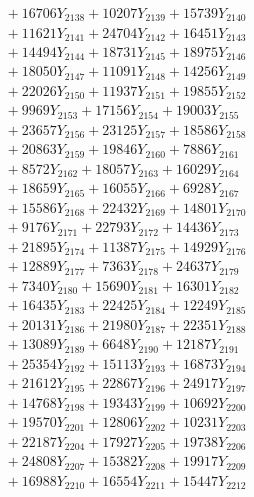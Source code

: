 \documentclass[a4paper,10pt]{article}
\begin{document}
{\begin{align}
&\;  + 16706 Y_{2138} + 10207 Y_{2139} + 15739 Y_{2140} \\[0.3ex]
&\;  + 11621 Y_{2141} + 24704 Y_{2142} + 16451 Y_{2143} \\[0.3ex]
&\;  + 14494 Y_{2144} + 18731 Y_{2145} + 18975 Y_{2146} \\[0.3ex]
&\;  + 18050 Y_{2147} + 11091 Y_{2148} + 14256 Y_{2149} \\[0.3ex]
&\;  + 22026 Y_{2150} + 11937 Y_{2151} + 19855 Y_{2152} \\[0.3ex]
&\;  + 9969 Y_{2153} + 17156 Y_{2154} + 19003 Y_{2155} \\[0.3ex]
&\;  + 23657 Y_{2156} + 23125 Y_{2157} + 18586 Y_{2158} \\[0.5ex]\allowbreak
&\;  + 20863 Y_{2159} + 19846 Y_{2160} + 7886 Y_{2161} \\[0.3ex]
&\;  + 8572 Y_{2162} + 18057 Y_{2163} + 16029 Y_{2164} \\[0.3ex]
&\;  + 18659 Y_{2165} + 16055 Y_{2166} + 6928 Y_{2167} \\[0.3ex]
&\;  + 15586 Y_{2168} + 22432 Y_{2169} + 14801 Y_{2170} \\[0.3ex]
&\;  + 9176 Y_{2171} + 22793 Y_{2172} + 14436 Y_{2173} \\[0.3ex]
&\;  + 21895 Y_{2174} + 11387 Y_{2175} + 14929 Y_{2176} \\[0.3ex]
&\;  + 12889 Y_{2177} + 7363 Y_{2178} + 24637 Y_{2179} \\[0.3ex]
&\;  + 7340 Y_{2180} + 15690 Y_{2181} + 16301 Y_{2182} \\[0.3ex]
&\;  + 16435 Y_{2183} + 22425 Y_{2184} + 12249 Y_{2185} \\[0.3ex]
&\;  + 20131 Y_{2186} + 21980 Y_{2187} + 22351 Y_{2188} \\[0.5ex]\allowbreak
&\;  + 13089 Y_{2189} + 6648 Y_{2190} + 12187 Y_{2191} \\[0.3ex]
&\;  + 25354 Y_{2192} + 15113 Y_{2193} + 16873 Y_{2194} \\[0.3ex]
&\;  + 21612 Y_{2195} + 22867 Y_{2196} + 24917 Y_{2197} \\[0.3ex]
&\;  + 14768 Y_{2198} + 19343 Y_{2199} + 10692 Y_{2200} \\[0.3ex]
&\;  + 19570 Y_{2201} + 12806 Y_{2202} + 10231 Y_{2203} \\[0.3ex]
&\;  + 22187 Y_{2204} + 17927 Y_{2205} + 19738 Y_{2206} \\[0.3ex]
&\;  + 24808 Y_{2207} + 15382 Y_{2208} + 19917 Y_{2209} \\[0.3ex]
&\;  + 16988 Y_{2210} + 16554 Y_{2211} + 15447 Y_{2212} \\[0.3ex]

\end{align}}
\end{document}

